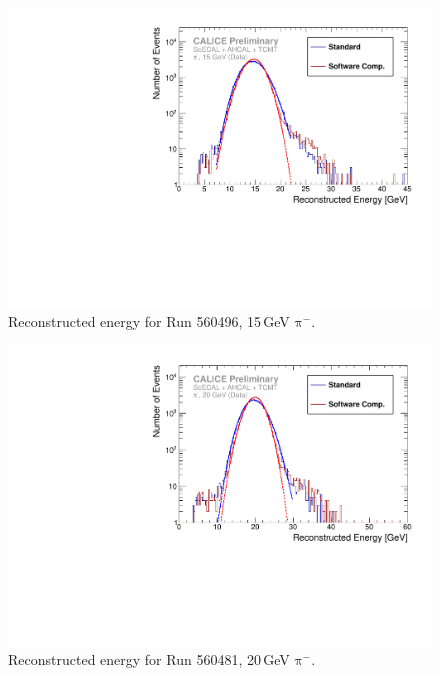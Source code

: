 \documentclass[twoside,a4paper,12pt]{article}
\newcommand\piminus{\(\mathrm{\pi^-}\)}
\begin{document}
\begin{figure}[htbp]
\begin{center}
\includegraphics[width=1\textwidth,page=1]{ERec_classic_SC_560496_data}
\caption{Reconstructed energy for Run 560496, 15\,GeV \piminus.}
\label{fig:erec_15gev}
\end{center}
\end{figure}

\begin{figure}[htbp]
\begin{center}
\includegraphics[width=1\textwidth,page=1]{ERec_classic_SC_560481_data}
\caption{Reconstructed energy for Run 560481, 20\,GeV \piminus.}
\label{fig:erec_20gev}
\end{center}
\end{figure}
\end{document}
